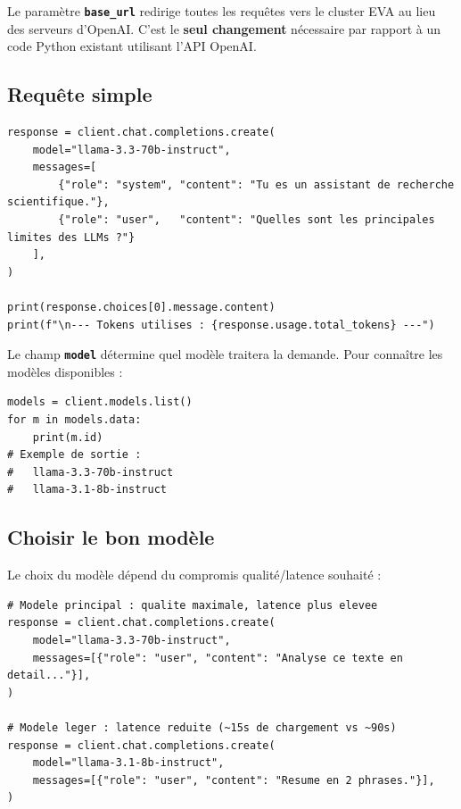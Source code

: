 \documentclass[12pt, a4paper, twoside]{article}
\newcommand{\param}[1]{\texttt{\textbf{#1}}}
\begin{document}
Le paramètre \param{base\_url} redirige toutes les requêtes vers le cluster EVA au lieu
des serveurs d'OpenAI. C'est le \textbf{seul changement} nécessaire par rapport à un
code Python existant utilisant l'API OpenAI.

\subsection{Requête simple}

\begin{lstlisting}[style=pythonstyle, caption={Génération de texte simple}]
response = client.chat.completions.create(
    model="llama-3.3-70b-instruct",
    messages=[
        {"role": "system", "content": "Tu es un assistant de recherche scientifique."},
        {"role": "user",   "content": "Quelles sont les principales limites des LLMs ?"}
    ],
)

print(response.choices[0].message.content)
print(f"\n--- Tokens utilises : {response.usage.total_tokens} ---")
\end{lstlisting}

Le champ \param{model} détermine quel modèle traitera la demande. Pour connaître
les modèles disponibles :

\begin{lstlisting}[style=pythonstyle, caption={Lister les modèles depuis Python}]
models = client.models.list()
for m in models.data:
    print(m.id)
# Exemple de sortie :
#   llama-3.3-70b-instruct
#   llama-3.1-8b-instruct
\end{lstlisting}

\subsection{Choisir le bon modèle}

Le choix du modèle dépend du compromis qualité/latence souhaité :

\begin{lstlisting}[style=pythonstyle, caption={Sélection du modèle adapté au cas d'usage}]
# Modele principal : qualite maximale, latence plus elevee
response = client.chat.completions.create(
    model="llama-3.3-70b-instruct",
    messages=[{"role": "user", "content": "Analyse ce texte en detail..."}],
)

# Modele leger : latence reduite (~15s de chargement vs ~90s)
response = client.chat.completions.create(
    model="llama-3.1-8b-instruct",
    messages=[{"role": "user", "content": "Resume en 2 phrases."}],
)
\end{lstlisting}
\end{document}
